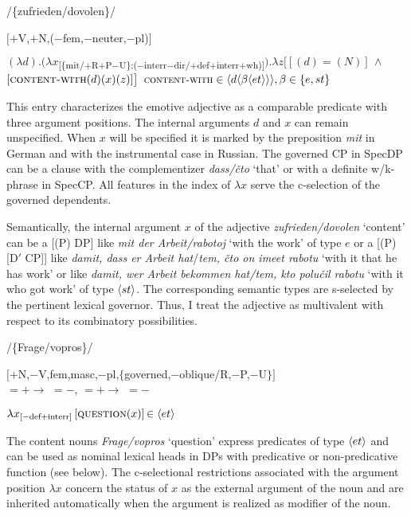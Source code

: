 \documentclass[output=paper,
colorlinks,
citecolor=brown,
newtxmath
]{langscibook}
\begin{document}
    \largerpage

\ea\label{ex:16}
    \ea\label{ex:16a} /\{zufrieden/dovolen\textsubscript{\textalpha}\}/

    \ex\label{ex:16b} $\lbrack+$V,$+$N,($-$fem,$-$neuter,$-$pl)\textsubscript{\textalpha}$\rbrack$

    \ex\label{ex:16c} $(\lambda d) . (\lambda x$\textsubscript{[\{mit/$+$R$+$P$-$U\};($-$interr$-$dir/$+$def$+$interr$+$wh)]}$) . \lambda z \big[[(d) = (N)] \, \wedge$ $[\textsc{content-with} (d) (x) (z)]\big]$ $\\ {\small \textsc{content-with} \in \langle{d\ensuremath{\langle{\beta\ensuremath{\langle{{et}}\rangle}}\rangle}}\rangle, {\beta} \in \{e,st\}}$
\z\z

\noindent This entry characterizes the emotive adjective as a comparable predicate with three argument positions. The internal arguments $d$ and $x$ can remain unspecified. When $x$ will be specified it is marked by the preposition \textit{mit} in German and with the instrumental case in Russian. The governed CP in SpecDP can be a clause with the complementizer \textit{dass/čto} `that' or with a definite w/k-phrase in SpecCP. All features in the index of $\lambda x$ serve the c-selection of the governed dependents.

Semantically, the internal argument $x$ of the adjective \textit{zufrieden/dovolen} `content' can be a [(P) DP] like \textit{mit der Arbeit/rabotoj} `with the work' of type $e$ or a [(P) [D$'$ CP]] like \textit{damit, dass er Arbeit hat}/\textit{tem, čto on imeet rabotu} `with it that he has work' or like \textit{damit, wer Arbeit bekommen hat/tem, kto polučil rabotu} `with it who got work' of type $\langle{st}\rangle$. The corresponding semantic types are s-selected by the pertinent lexical governor. Thus, I treat the adjective as multivalent with respect to its combinatory possibilities.

\ea\label{ex:17}
    \ea /\{Frage\textsubscript{\textalpha}/vopros\textsubscript{\textbeta}\}/ \label{ex:17a}

    \ex $\lbrack +$N,$-$V,\textalpha fem,\textbeta masc,$-$pl,$\lbrace$\textgamma governed,$-$oblique/\textgamma R,$-$P,$-$U$\rbrace\rbrack$ \\
    {\small \textalpha{} $= + \rightarrow$ \textbeta{} $= -$, \textbeta{} $= + \rightarrow$ \textalpha{} $= -$} \label{ex:17b}

    \ex $\lambda x_{[-\textrm{def}+\textrm{interr}]} \, [\textsc{question} (x)] \, {\small \in \stb{et}}$\label{ex:17c}
\z\z

\noindent The content nouns \textit{Frage/vopros} `question' express predicates of type $\langle{et}\rangle$ and can be used as nominal lexical heads in DPs with predicative or non-predicative function (see below). The c-selectional restrictions associated with the argument position $\lambda x$ concern the status of $x$ as the external argument of the noun and are inherited automatically when the argument is realized as modifier of the noun.
\end{document}
